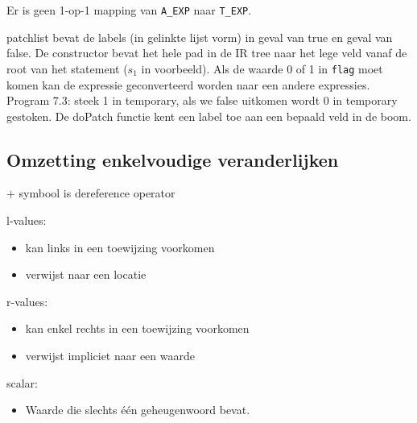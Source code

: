 Er is geen 1-op-1 mapping van \texttt{A\_EXP} naar \texttt{T\_EXP}.


patchlist bevat de labels (in gelinkte lijst vorm) in geval van true en geval van false. De constructor bevat het hele pad in de IR tree naar het lege veld vanaf de root van het statement ($s_1$ in voorbeeld). Als de waarde 0 of 1 in \texttt{flag} moet komen kan de expressie geconverteerd worden naar een andere expressies. Program 7.3: steek 1 in temporary, als we false uitkomen wordt 0 in temporary gestoken. De doPatch functie kent een label toe aan een bepaald veld in de boom.

\subsection{Omzetting enkelvoudige veranderlijken}

$+$ symbool is dereference operator


l-values:
\begin{itemize}
	\item kan links in een toewijzing voorkomen
	\item verwijst naar een locatie
\end{itemize}

r-values:
\begin{itemize}
	\item kan enkel rechts in een toewijzing voorkomen
	\item verwijst impliciet naar een waarde
\end{itemize}

scalar:
\begin{itemize}
	\item Waarde die slechts één geheugenwoord bevat.
\end{itemize}




